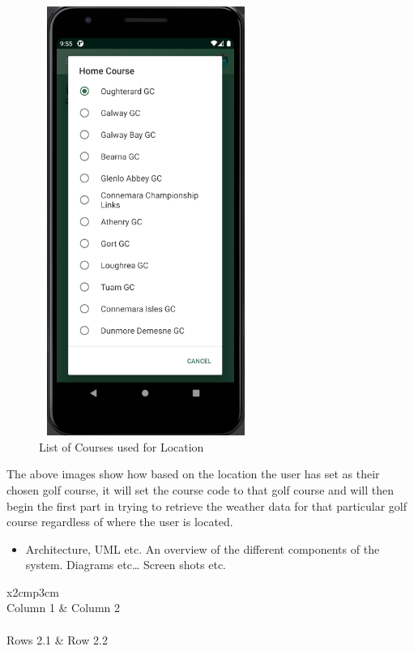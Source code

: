 \begin{figure}[H]
    \centering
    \includegraphics[width=7cm,height = 14cm]{img/InPhoneList.PNG}
    \caption{List of Courses used for Location}
    \label{fig:altas config}
\end{figure}

The above images show how based on the location the user has set as their chosen golf course, it will set the course code to that golf course and will then begin the first part in trying to retrieve the weather data for that particular golf course regardless of where the user is located.




\begin{itemize}
\item Architecture, UML etc. An overview of the different components of the system. Diagrams etc… Screen shots etc.
\end{itemize}
\begin{table}[h]
  \centering
  \begin{tabular}{x{2cm}p{3cm}}
    \toprule \\
    Column 1 & Column 2 \\
    \midrule \\
    Rows 2.1 & Row 2.2 \\
    \bottomrule
  \end{tabular}
  \caption{A table.}
  \label{table:mytable}
\end{table}
